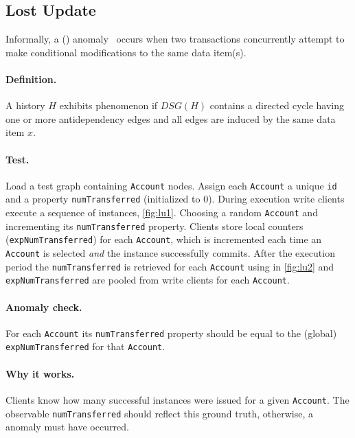 \subsection{Lost Update}
\label{sec:lost-update}

Informally, a  () 
anomaly~\cite{DBLP:journals/tods/BailisFGHS16} occurs when two transactions 
concurrently attempt to make conditional modifications to the same data item(s).

\paragraph{Definition.}
A history $H$ exhibits phenomenon  if $\textit{DSG}(H)$ contains a 
directed cycle having one or more antidependency edges and all edges are induced
by the same data item $x$.

\paragraph{Test.}
Load a test graph containing \texttt{Account} nodes. Assign each \texttt{Account} 
a unique \texttt{id} and a property \texttt{numTransferred} (initialized to 0).
During execution write clients execute a sequence of  
instances, \autoref{fig:lu1}. Choosing a random \texttt{Account} and incrementing 
its \texttt{numTransferred} property. Clients store local counters 
(\texttt{expNumTransferred}) for each \texttt{Account}, which is incremented 
each time an \texttt{Account} is selected \emph{and} the  
instance successfully commits. After the execution period the 
\texttt{numTransferred} is retrieved for each \texttt{Account} using 
 in \autoref{fig:lu2} and \texttt{expNumTransferred} are 
pooled from write clients for each \texttt{Account}.

\paragraph{Anomaly check.}
For each \texttt{Account} its \texttt{numTransferred} property should be equal 
to the (global) \texttt{expNumTransferred} for that \texttt{Account}.

\paragraph{Why it works.}
Clients know how many successful  instances were issued 
for a given \texttt{Account}. The observable \texttt{numTransferred} should 
reflect this ground truth, otherwise, a  anomaly must have occurred.

